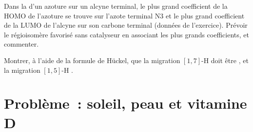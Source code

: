 \begin{exercise}[$\star\star\star$]\label{exo:b3:pericyclic:11}
Dans la  d'un azoture sur un alcyne terminal, le
plus grand coefficient de la HOMO de l'azoture se trouve sur l'azote
terminal N3 et le plus grand coefficient de la LUMO de l'alcyne sur son
carbone terminal (données de l'exercice). Prévoir le régioisomère favorisé
sans catalyseur en associant les plus grands coefficients, et commenter.
\end{exercise}

\begin{exercise}[$\star\star\star$]\label{exo:b3:pericyclic:12}
Montrer, à l'aide de la formule de Hückel, que la migration $[1,7]$-H doit être ,
et la migration $[1,5]$-H .
\end{exercise}

\clearpage
\enlargethispage{3\baselineskip}
\section{Problème~: soleil, peau et vitamine D}

